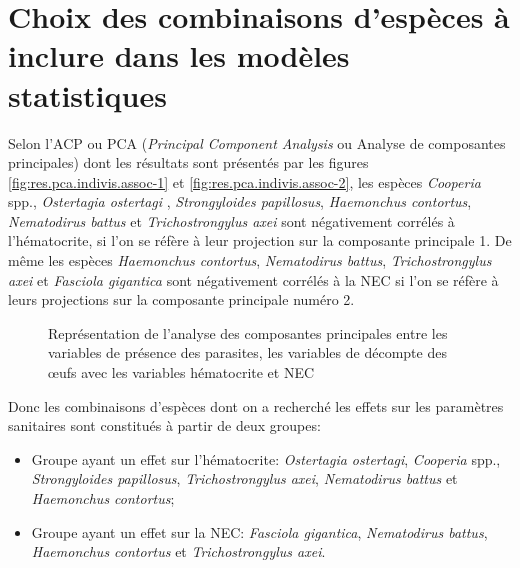 \chapter{Choix des combinaisons d'espèces à inclure dans les modèles statistiques} \label{annex:statistics-guide}

\renewcommand{\thefigure}{D.\arabic{figure}}
\setcounter{figure}{0}
\renewcommand{\thetable}{D.\Roman{table}}
\setcounter{table}{0}

\par Selon l’ACP ou PCA (\textit{Principal Component Analysis} ou Analyse de composantes principales) dont les résultats sont présentés par les figures \ref{fig:res.pca.indivis.assoc-1} et \ref{fig:res.pca.indivis.assoc-2}, les espèces \textit{Cooperia} spp., \textit{Ostertagia ostertagi }, \textit{Strongyloides papillosus}, \textit{Haemonchus contortus}, \textit{Nematodirus battus} et \textit{Trichostrongylus axei} sont négativement corrélés à l’hématocrite, si l'on se réfère à leur projection sur la composante principale 1. De même les espèces \textit{Haemonchus contortus}, \textit{Nematodirus battus}, \textit{Trichostrongylus axei} et \textit{Fasciola gigantica} sont négativement corrélés à la NEC si l'on se réfère à leurs projections sur la composante principale numéro 2. 

\begin{figure}[!ht]
	{
		\centering 
	}
	\caption{Représentation de l'analyse des composantes principales entre les variables de présence des parasites, les variables de décompte des \oe ufs avec les variables hématocrite et NEC}\label{fig:res.pca.indivis.assoc}
\end{figure}

\par Donc les combinaisons d'espèces dont on a recherché les effets sur les paramètres sanitaires sont constitués à partir de deux groupes:
\begin{itemize}
	\item Groupe ayant un effet sur l’hématocrite: \textit{Ostertagia ostertagi}, \textit{Cooperia} spp., \textit{Strongyloides papillosus}, \textit{Trichostrongylus axei}, \textit{Nematodirus battus} et \textit{Haemonchus contortus};
	\item Groupe ayant un effet sur la NEC: \textit{Fasciola gigantica}, \textit{Nematodirus battus}, \textit{Haemonchus contortus} et \textit{Trichostrongylus axei}.
\end{itemize}

